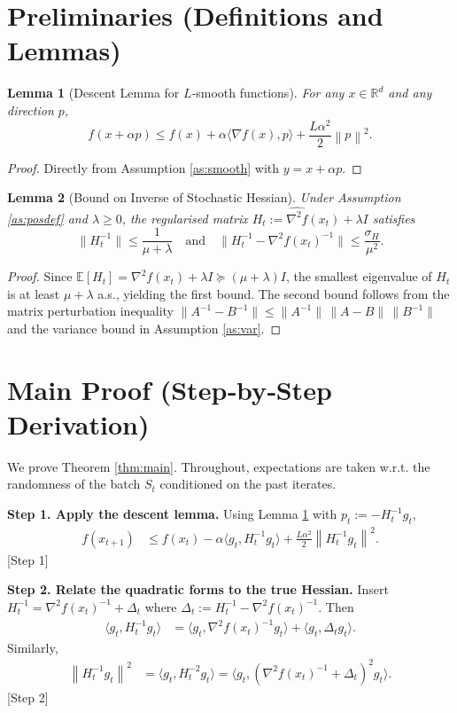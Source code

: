 \documentclass{article}
\newtheorem{lemma}{Lemma}
\newcommand{\E}{\mathbb{E}}
\newcommand{\R}{\mathbb{R}}
\newcommand{\norm}[1]{\left\|#1\right\|}
\newcommand{\grad}{\nabla}
\begin{document}
\newpage
\section*{Preliminaries (Definitions and Lemmas)}
\begin{lemma}[Descent Lemma for $L$‑smooth functions]\label{lem:descent}
For any $x\in\R^d$ and any direction $p$,
\[
f(x+\alpha p)\le f(x)+\alpha\langle \grad f(x),p\rangle+\frac{L\alpha^2}{2}\norm{p}^2 .
\]
\end{lemma}
\begin{proof}
Directly from Assumption \ref{as:smooth} with $y=x+\alpha p$.
\end{proof}

\begin{lemma}[Bound on Inverse of Stochastic Hessian]\label{lem:inv}
Under Assumption \ref{as:posdef} and $\lambda\ge0$, the regularised matrix $H_t:=\widehat{\nabla^2 f}(x_t)+\lambda I$ satisfies
\[
\|H_t^{-1}\|\le \frac{1}{\mu+\lambda}\quad\text{and}\quad 
\|H_t^{-1}-\nabla^2 f(x_t)^{-1}\|\le \frac{\sigma_H}{\mu^2}.
\]
\end{lemma}
\begin{proof}
Since $\E[H_t]=\nabla^2 f(x_t)+\lambda I\succeq (\mu+\lambda)I$, the smallest eigenvalue of $H_t$ is at least $\mu+\lambda$ a.s., yielding the first bound.  The second bound follows from the matrix perturbation inequality
$\|A^{-1}-B^{-1}\|\le \|A^{-1}\|\,\|A-B\|\,\|B^{-1}\|$ and the variance bound in Assumption \ref{as:var}.
\end{proof}

\section*{Main Proof (Step‑by‑Step Derivation)}
We prove Theorem \ref{thm:main}.  Throughout, expectations are taken w.r.t. the randomness of the batch $S_t$ conditioned on the past iterates.

\bigskip
\noindent\textbf{Step 1. Apply the descent lemma.}  
Using Lemma \ref{lem:descent} with $p_t:=-H_t^{-1}g_t$,
\begin{align}
f(x_{t+1})
&\le f(x_t)-\alpha\langle g_t, H_t^{-1}g_t\rangle
   +\frac{L\alpha^2}{2}\norm{H_t^{-1}g_t}^2 .
\tag{5}
\end{align}
[Step 1]

\bigskip
\noindent\textbf{Step 2. Relate the quadratic forms to the true Hessian.}  
Insert $H_t^{-1}= \nabla^2 f(x_t)^{-1}+ \Delta_t$ where $\Delta_t:=H_t^{-1}-\nabla^2 f(x_t)^{-1}$.  Then
\begin{align}
\langle g_t, H_t^{-1}g_t\rangle
&= \langle g_t, \nabla^2 f(x_t)^{-1}g_t\rangle
   +\langle g_t, \Delta_t g_t\rangle .
\tag{6}
\end{align}
Similarly,
\begin{align}
\norm{H_t^{-1}g_t}^2
&= \langle g_t, H_t^{-2} g_t\rangle
 = \langle g_t, (\nabla^2 f(x_t)^{-1}+\Delta_t)^2 g_t\rangle .
\tag{7}
\end{align}
[Step 2]
\end{document}

